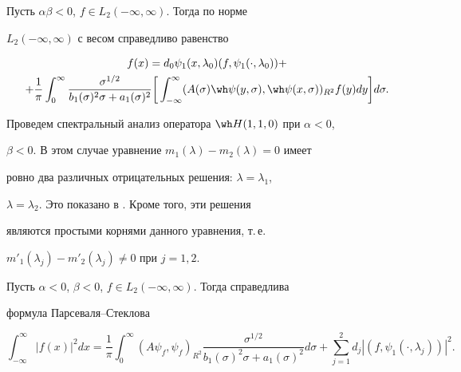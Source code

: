 \begin{cor} 


Пусть $\alpha\beta<0$, $f\in L_2(-\infty,\infty)$. Тогда по норме 


$L_2(-\infty,\infty)$ с весом справедливо равенство 


\begin{multline*} 


f(x)=d_0\psi_1(x,\lambda_0)(f,\psi_1(\cdot,\lambda_0))+ \\ 


+\frac{1}{\pi}\int^\infty_0 


\frac{\sigma^{1/2}}{b_1(\sigma)^2\sigma+a_1(\sigma)^2}\bigg[ 


\int^\infty_{-\infty}(A(\sigma)\wh\psi(y,\sigma), 


\wh\psi(x,\sigma))_{R^2}f(y)dy\bigg]d\sigma. 


\end{multline*} 


\end{cor} 


\addtocounter{cor}{-2} 


 


Проведем спектральный анализ оператора $\wh H(1,1,0)$ при $\alpha<0$, 


$\beta<0$. В этом случае уравнение $m_1(\lambda)-m_2(\lambda)=0$ имеет 


ровно два различных отрицательных решения: $\lambda=\lambda_1$, 


$\lambda=\lambda_2$. Это показано в \cite{2}. Кроме того, эти решения 


являются простыми корнями данного уравнения, т.\,е. 


$m'_1(\lambda_j)-m'_2(\lambda_j)\ne0$ при $j=1,2$. 


 


\begin{thm} 


Пусть $\alpha<0$, $\beta<0$, $f\in L_2(-\infty,\infty)$. Тогда справедлива 


формула Парсеваля--Стеклова 


$$ 


\int^\infty_{-\infty}|f(x)|^2dx=\frac{1}{\pi}\int^\infty_0 


(A\psi_f,\psi_f)_{R^2} 


\frac{\sigma^{1/2}}{b_1(\sigma)^2\sigma+a_1(\sigma)^2}d\sigma+ 


\sum^2_{j=1}d_j|(f,\psi_1(\cdot,\lambda_j))|^2. 


$$ 


\end{thm} 


